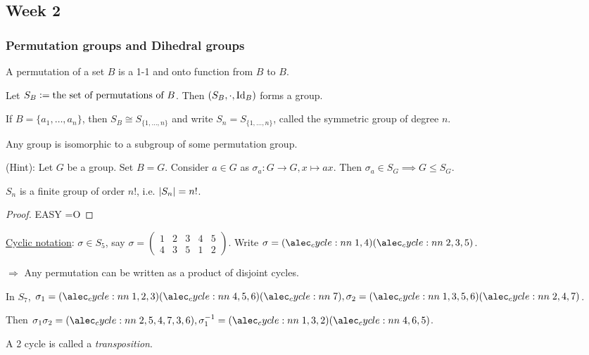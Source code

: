 \subsection{Week 2}
\subsubsection{Permutation groups and Dihedral groups}
\begin{definition}
  A permutation of a set $B$ is a 1-1 and onto function from $B$ to $B$.

  Let $S_B \vcentcolon= \text{the set of permutations of $B$}$. Then
  $(S_B, \cdot, {\rm Id}_B)$ forms a group.

  If $B = \{a_1, \dots, a_n\}$, then $S_B \cong S_{\{1,\dots,n\}}$ and write
  $S_n = S_{\{1,\dots,n\}}$, called the symmetric group of degree $n$.
\end{definition}

\begin{theorem}
  Any group is isomorphic to a subgroup of some permutation group.
  
  (Hint): Let $G$ be a group. Set $B = G$. Consider $a \in G$ as
  $\sigma_a: G \to G, x \mapsto ax$.
  Then $\sigma_a \in S_G \implies G \le S_G$.
\end{theorem}

\begin{fact}
  $S_n$ is a finite group of order $n!$, i.e. $\lvert S_n\rvert = n!$.
  \begin{proof}
    EASY =O
  \end{proof}
\end{fact}

\underline{Cyclic notation}: $\sigma \in S_5$, say $\sigma = \begin{pmatrix}
  1 & 2 & 3 & 4 & 5 \\
  4 & 3 & 5 & 1 & 2
\end{pmatrix}$.
Write $\sigma = \cycle{1, 4}\cycle{2, 3, 5}$.

$\Rightarrow$ Any permutation can be written as a product of disjoint cycles.

\begin{example}
  In $S_7$, $\sigma_1 = \cycle{1,2,3}\cycle{4,5,6}\cycle{7},
  \sigma_2 = \cycle{1,3,5,6}\cycle{2,4,7}$.

  Then $\sigma_1\sigma_2 = \cycle{2,5,4,7,3,6},
  \sigma_1^{-1} = \cycle{1,3,2}\cycle{4,6,5}$.
\end{example}

\begin{definition}
  A 2 cycle is called a {\it transposition}.
\end{definition}

